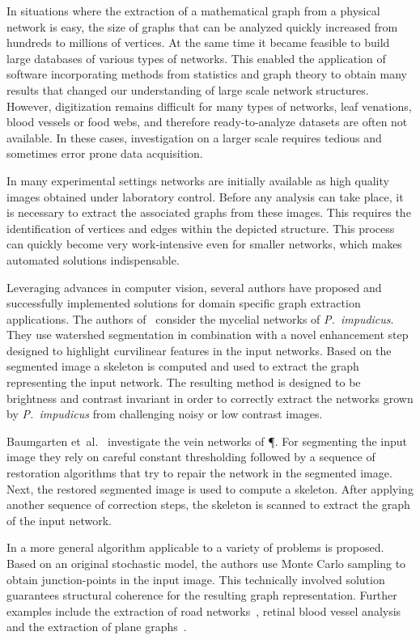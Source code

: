 	In situations where the extraction of a mathematical graph from a physical network is easy, the size of graphs that can be analyzed quickly increased from hundreds to millions of vertices. At the same time it became feasible to build large databases of various types of networks. This enabled the application of software incorporating methods from statistics and graph theory to obtain many results that changed our understanding of large scale network structures. However, digitization remains difficult for many types of networks, \eg leaf venations, blood vessels or food webs, and therefore ready-to-analyze datasets are often not available. In these cases, investigation on a larger scale requires tedious and sometimes error prone data acquisition.

	In many experimental settings networks are initially available as high quality images obtained under laboratory control. Before any analysis can take place, it is necessary to extract the associated graphs from these images. This requires the identification of vertices and edges within the depicted structure. This process can quickly become very work-intensive even for smaller networks, which makes automated solutions indispensable. 

	Leveraging advances in computer vision, several authors have proposed and successfully implemented solutions for domain specific graph extraction applications. The authors of~\cite{obara2012bioimage,obara2012contrast} consider the mycelial networks of \emph{P.\ impudicus}. They use	watershed segmentation in combination with a novel enhancement step designed to highlight curvilinear features in the input networks. Based on the segmented image a skeleton is computed and used to extract the graph representing the input network.	The resulting method is designed to be brightness and contrast invariant in order to correctly extract the networks grown by \emph{P.\ impudicus} from challenging noisy or low contrast images.
	
	Baumgarten et~al.~\cite{baumgarten2010detection,baumgarten2012computational} investigate the vein networks of \P. For segmenting the input image they rely on careful constant thresholding followed by a sequence of restoration algorithms that try to repair the network in the segmented image. Next, the restored segmented image is used to compute a skeleton. After	applying another sequence of correction steps, the skeleton is scanned to extract the graph of the input network.
 
	In \cite{chai2013recovering} a more general algorithm applicable to a variety of problems is proposed. Based on an original stochastic model, the authors use Monte Carlo sampling to obtain junction-points in the input image. This technically involved solution guarantees structural coherence for the resulting graph representation. Further examples include the extraction of road networks~\cite{nglt2006}, retinal blood vessel analysis~\cite{krause2013fast} and the extraction of plane graphs~\cite{hewrw2010}.

